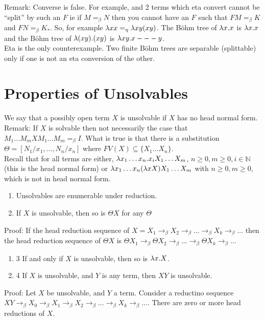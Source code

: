 Remark: Converse is false. For example, and 2 terms which eta convert cannot be ``split'' by such an $F$ ie if $M =_\beta N$ then you cannot have an $F$ such that $FM =_\beta K$ and $FN =_\beta K_*$. So, for example $\lambda xx =_\eta \lambda xy(xy)$. The B\"ohm tree of $\lambda x.x$ is $\lambda x.x$ and the B\"ohm tree of $\lambda (xy).(xy)$ is $\lambda xy. x --- y$.\\ %

Eta is the only counterexample. Two finite B\"ohm trees are separable (splittable) only if one is not an eta conversion of the other.\\

\section{Properties of Unsolvables}
We say that a possibly open term $X$ is unsolvable if $X$ has no head normal form.\\

Remark: If $X$ is solvable then not necessarily the case that $M_1\ldots M_m XM_1\ldots M_m =_\beta I$. What is true is that there is a substitution $\Theta = [N_1/x_1,\ldots, N_n/x_n]$ where $FV(X) \subseteq \{X_1\ldots X_n\}$.\\

Recall that for all terms are either, $\lambda x_1 \ldots x_n. x_i X_1\ldots X_m$, $n \geq 0, m \geq 0, i \in \mathbb{N}$ (this is the head normal form) or $\lambda x_1\ldots x_n (\lambda xX)X_1\ldots X_m$ with $n \geq 0, m \geq 0$, which is not in head normal form.\\

\begin{enumerate}[(1)]
  \item Unsolvables are enumerable under reduction.
  \item If $X$ is unsolvable, then so is $\Theta X$ for any $\Theta$
\end{enumerate}
Proof: If the head reduction sequence of $X = X_1 \rightarrow_\beta X_2 \rightarrow_\beta \ldots \rightarrow_\beta X_k \rightarrow_\beta \ldots$ then the head reduction sequence of $\Theta X$ is $\Theta X_1 \rightarrow_\beta \Theta X_2 \rightarrow_\beta \ldots \rightarrow_\beta \Theta X_k \rightarrow_\beta \ldots$

\begin{enumerate}[(1)]
  \item 3 If and only if $X$ is unsolvable, then so is $\lambda x.X$.
  \item 4 If $X$ is unsolvable, and $Y$ is any term, then $XY$ is unsolvable.
\end{enumerate}
Proof: Let $X$ be unsolvable, and $Y$ a term. Consider a reductino sequence $XY \rightarrow_\beta X_0 \rightarrow_\beta X_1 \rightarrow_\beta X_2 \rightarrow_\beta \ldots \rightarrow_\beta X_k \rightarrow_\beta \ldots$. There are zero or more head reductions of $X$.\\

